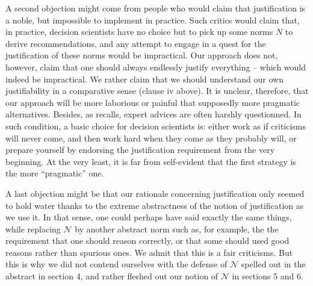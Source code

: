 \documentclass[preprint, french, english, 11pt, authoryear]{elsarticle}%
\newcommand{\adv}{\mathscr{N}}
\begin{document}
A second objection might come from people who would claim that justification is a noble, but impossible to implement in practice. Such critics would claim that, in practice, decision scientists have no choice but to pick up some norms $N$ to derive recommendations, and any attempt to engage in a quest for the justification of these norms would be impractical. Our approach does not, however, claim that one should always endlessly justify everything -- which would indeed be impractical. We rather claim that we should understand our own justifiability in a comparative sense (clause iv above). It is unclear, therefore, that our approach will be more laborious or painful that supposedly more pragmatic alternatives. Besides, as \citet{godard_environnement_2015} recalls, expert advices are often harshly questionned. In such condition, a basic choice for decision scientists is: either work as if criticisms will never come, and then work hard when they come as they probably will, or prepare yourself by endorsing the justification requirement from the very beginning. At the very least, it is far from self-evident that the first strategy is the more ``pragmatic'' one.

A last objection might be that our rationale concerning justification only seemed to hold water thanks to the extreme abstractness of the notion of justification as we use it. In that sense, one could perhaps have said exactly the same things, while replacing $\adv$ by another abstract norm such as, for example, the the requirement that one should reason correctly, or that some should used good reasons rather than spurious ones. We admit that this is a fair criticisms. But this is why we did not contend ourselves with the defense of $\adv$ spelled out in the abstract in section 4, and rather fleshed out our notion of $\adv$ in sections 5 and 6.


\end{document}
